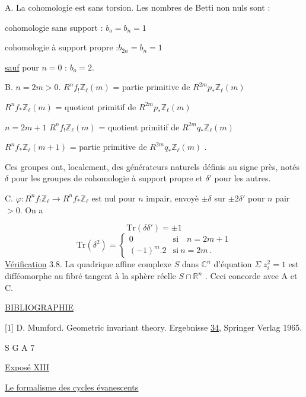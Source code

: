 A.  La cohomologie est sans torsion. Les nombres de Betti non nuls sont :

cohomologie sans support  :  $b_o = b_n = 1$

cohomologie à support propre :$b_{2n} = b_n = 1$

\underline{sauf} pour $n = 0$  :  $b_o = 2$.

B.  $n = 2m > 0$.  $R^n f_{!} \mathbb{Z}_\ell(m)$ = partie primitive de $R^{2m} p_{*} \mathbb{Z}_\ell(m)$

$R^n f_{*} \mathbb{Z}_\ell(m)$ = quotient primitif de $R^{2m} p_{*} \mathbb{Z}_\ell(m)$

$n = 2m + 1$   $R^n f_{!} \mathbb{Z}_\ell(m)$ = quotient primitif de $R^{2m} q_{*} \mathbb{Z}_\ell(m)$

$R^n f_{*} \mathbb{Z}_\ell(m+1)$ = partie primitive de $R^{2m} q_{*} \mathbb{Z}_\ell(m)$  .

Ces groupes ont, localement, des générateurs naturels définis au signe près, notés $\delta$ pour les groupes de cohomologie à support propre et $\delta'$ pour les autres.

C.  $\varphi : R^n f_{!} \mathbb{Z}_\ell \longrightarrow R^n f_{*} \mathbb{Z}_\ell$ est nul pour $n$ impair, envoyè $\pm \delta$ sur $\pm 2 \delta'$ pour $n$ pair $> 0$. On a

\begin{equation*}
\mathrm{Tr}(\delta\delta') = \pm 1
\end{equation*}
\begin{equation*}
\mathrm{Tr}(\delta^2) = \begin{cases} 0 & \text{si} \quad n = 2m + 1 \\ (-1)^m . 2 & \text{si} \ n = 2m \ . \end{cases}
\end{equation*}
\underline{Vérification} 3.8.  La quadrique affine complexe $S$ dans $\mathbb{C}^n$ d'équation $\Sigma \; z_i^2 = 1$ est difféomorphe au fibré tangent à la sphère réelle $S \cap \mathbb{R}^n$ .  Ceci concorde avec A et C.

\underline{BIBLIOGRAPHIE}

{[}1]  D. Mumford.  Geometric invariant theory. Ergebnisse \underline{34}, Springer Verlag 1965.




S G A  7


\underline{Exposé XIII}


\underline{\underline{Le formalisme des cycles évanescents}}


